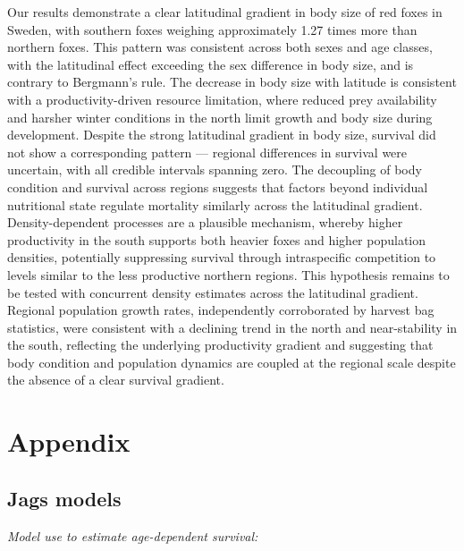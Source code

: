 \documentclass[12pt,a4paper,final,abstract=true,headings=small]{scrartcl}
\begin{document}
Our results demonstrate a clear latitudinal gradient in body size of red foxes in Sweden, with southern foxes weighing approximately 1.27 times more than northern foxes. This pattern was consistent across both sexes and age classes, with the latitudinal effect exceeding the sex difference in body size, and is contrary to Bergmann's rule. The decrease in body size with latitude is consistent with a productivity-driven resource limitation, where reduced prey availability and harsher winter conditions in the north limit growth and body size during development. Despite the strong latitudinal gradient in body size, survival did not show a corresponding pattern --- regional differences in survival were uncertain, with all credible intervals
spanning zero. The decoupling of body condition and survival across regions suggests that factors beyond individual nutritional state regulate mortality similarly across the latitudinal gradient. Density-dependent processes are
a plausible mechanism, whereby higher productivity in the south supports both heavier foxes and higher population densities, potentially suppressing survival through intraspecific competition to levels similar to the less productive northern regions. This hypothesis remains to be tested with concurrent density estimates across the latitudinal gradient. Regional population growth rates, independently corroborated by harvest bag statistics, were consistent with a declining trend in the north and
near-stability in the south, reflecting the underlying productivity gradient and suggesting that body condition and population dynamics are coupled at the regional scale despite the absence of a clear survival gradient.

\newpage
\singlespacing
\printbibliography

\newpage

\section*{Appendix}\label{app:model}

\subsection*{Jags models}

\emph{Model use to estimate age-dependent survival:}
\end{document}
